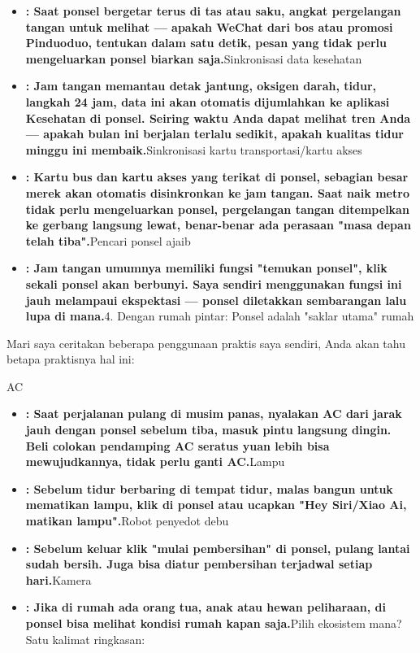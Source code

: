 \begin{itemize}
  \item \textbf{: Saat ponsel bergetar terus di tas atau saku, angkat pergelangan tangan untuk melihat — apakah WeChat dari bos atau promosi Pinduoduo, tentukan dalam satu detik, pesan yang tidak perlu mengeluarkan ponsel biarkan saja.}Sinkronisasi data kesehatan
  \item \textbf{: Jam tangan memantau detak jantung, oksigen darah, tidur, langkah 24 jam, data ini akan otomatis dijumlahkan ke aplikasi Kesehatan di ponsel. Seiring waktu Anda dapat melihat tren Anda — apakah bulan ini berjalan terlalu sedikit, apakah kualitas tidur minggu ini membaik.}Sinkronisasi kartu transportasi/kartu akses
  \item \textbf{: Kartu bus dan kartu akses yang terikat di ponsel, sebagian besar merek akan otomatis disinkronkan ke jam tangan. Saat naik metro tidak perlu mengeluarkan ponsel, pergelangan tangan ditempelkan ke gerbang langsung lewat, benar-benar ada perasaan "masa depan telah tiba".}Pencari ponsel ajaib
  \item \textbf{: Jam tangan umumnya memiliki fungsi "temukan ponsel", klik sekali ponsel akan berbunyi. Saya sendiri menggunakan fungsi ini jauh melampaui ekspektasi — ponsel diletakkan sembarangan lalu lupa di mana.}4. Dengan rumah pintar: Ponsel adalah "saklar utama" rumah
\end{itemize}


Mari saya ceritakan beberapa penggunaan praktis saya sendiri, Anda akan tahu betapa praktisnya hal ini:

AC

\begin{itemize}
  \item \textbf{: Saat perjalanan pulang di musim panas, nyalakan AC dari jarak jauh dengan ponsel sebelum tiba, masuk pintu langsung dingin. Beli colokan pendamping AC seratus yuan lebih bisa mewujudkannya, tidak perlu ganti AC.}Lampu
  \item \textbf{: Sebelum tidur berbaring di tempat tidur, malas bangun untuk mematikan lampu, klik di ponsel atau ucapkan "Hey Siri/Xiao Ai, matikan lampu".}Robot penyedot debu
  \item \textbf{: Sebelum keluar klik "mulai pembersihan" di ponsel, pulang lantai sudah bersih. Juga bisa diatur pembersihan terjadwal setiap hari.}Kamera
  \item \textbf{: Jika di rumah ada orang tua, anak atau hewan peliharaan, di ponsel bisa melihat kondisi rumah kapan saja.}Pilih ekosistem mana? Satu kalimat ringkasan:
\end{itemize}

